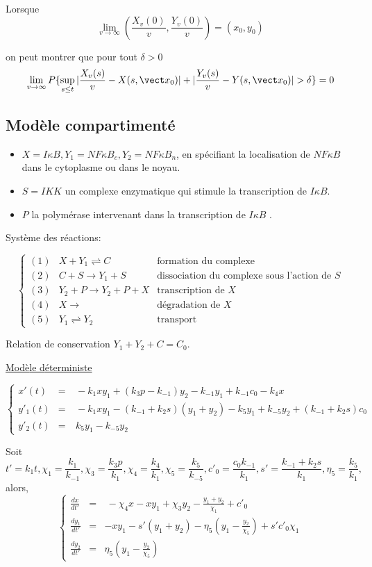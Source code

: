\documentclass{article}
\def\magenta{\color{goldenrod}}
\def\mblue{\color{MidnightBlue}}
\begin{document}
Lorsque
\[\lim_{v\rightarrow \infty}(\frac{X_v(0)}{v},\frac{Y_v(0)}{v}) = (x_0,y_0)\]

on peut montrer que pour tout $\delta >0$
\[
 \lim_{v\rightarrow \infty}P\{\sup_{s\le t} \arrowvert \frac{X_v(s)}{v}-X(s,\vect x_0)\arrowvert +\arrowvert\frac{Y_v(s)}{v}-Y(s,\vect x_0)\arrowvert >\delta\} = 0
\]

\subsection{\magenta \textsf{\Large Mod{\`e}le compartiment{\'e}}}


\begin{itemize} \mblue \large
\item[]
$X=I\kappa B, Y_1=NF\kappa B_c, Y_2=NF\kappa B_n$, en sp{\'e}cifiant la localisation
de $NF\kappa B$ dans le cytoplasme ou dans le noyau.
\item[]
$S=IKK$ un complexe enzymatique qui stimule la transcription de $I\kappa B$.
\item[]
$P$ la polym{\'e}rase intervenant dans la transcription de $I\kappa B$  .
\end{itemize}


Syst{\`e}me des r{\'e}actions:


\[
  \left \{
 \begin{array}{lll}
(1) &  X+Y_1 \rightleftharpoons C  & \textrm{formation du complexe}\\
(2) & C+S \to Y_1+S  &  \textrm{dissociation du complexe sous l'action de $S$} \\
(3)  & Y_2+P\to Y_2+P+X  & \textrm{transcription de $X$} \\
(4) & X\to   & \textrm{d{\'e}gradation de $X$} \\
(5) & Y_1\rightleftharpoons Y_2 & \textrm{transport}
\end{array} \right.
\]

Relation de conservation $Y_1+Y_2+C=C_0$.

\underline{Mod{\`e}le d{\'e}terministe}

\[
  \left \{
 \begin{array}{lll}
x'(t) & = & \ -k_1xy_1+(k_3p-k_{-1})y_2-k_{-1}y_1+k_{-1}c_0-k_4x \\
y'_1(t) & = & \ -k_1xy_1-(k_{-1}+k_2s)(y_1+y_2)-k_5y_1+k_{-5}y_2+(k_{-1}+k_2s)c_0 \\
y'_2(t) & = & \ k_5y_1-k_{-5}y_2
\end{array} \right.
\]

Soit
\[
t'=k_1t, \chi_1=\frac{k_1}{k_{-1}}, \chi_3=\frac{k_3p}{k_1}, \chi_4=\frac{k_4}{k_1},\chi_5=\frac{k_5}{k_{-5}}, c'_0=\frac{c_0k_{-1}}{k_1}, s'=\frac{k_{-1}+k_2s}{k_1}, \eta_5=\frac{k_5}{k_1},
\]
alors,
\[
  \left \{
 \begin{array}{lll}
\frac{dx}{dt'} & = & \ -\chi_4x-xy_1+\chi_3y_2-\frac{y_1+y_2}{\chi_1}+c'_0 \\
\frac{dy_1}{dt'} & = & -xy_1-s'(y_1+y_2)-\eta_5(y_1-\frac{y_2}{\chi_5})+s'c'_0\chi_1 \\
\frac{dy_2}{dt'} & = & \eta_5(y_1-\frac{y_2}{\chi_5})
\end{array} \right.
\]
\end{document}
